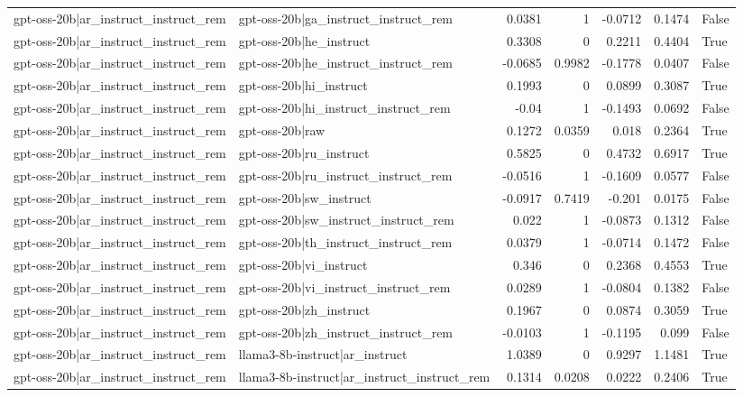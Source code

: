 \begin{table}
\begin{tabular}{l l r r r r l}
gpt-oss-20b|ar_instruct_instruct_rem & gpt-oss-20b|ga_instruct_instruct_rem & 0.0381 & 1 & -0.0712 & 0.1474 & False \\
gpt-oss-20b|ar_instruct_instruct_rem & gpt-oss-20b|he_instruct & 0.3308 & 0 & 0.2211 & 0.4404 & True \\
gpt-oss-20b|ar_instruct_instruct_rem & gpt-oss-20b|he_instruct_instruct_rem & -0.0685 & 0.9982 & -0.1778 & 0.0407 & False \\
gpt-oss-20b|ar_instruct_instruct_rem & gpt-oss-20b|hi_instruct & 0.1993 & 0 & 0.0899 & 0.3087 & True \\
gpt-oss-20b|ar_instruct_instruct_rem & gpt-oss-20b|hi_instruct_instruct_rem & -0.04 & 1 & -0.1493 & 0.0692 & False \\
gpt-oss-20b|ar_instruct_instruct_rem & gpt-oss-20b|raw & 0.1272 & 0.0359 & 0.018 & 0.2364 & True \\
gpt-oss-20b|ar_instruct_instruct_rem & gpt-oss-20b|ru_instruct & 0.5825 & 0 & 0.4732 & 0.6917 & True \\
gpt-oss-20b|ar_instruct_instruct_rem & gpt-oss-20b|ru_instruct_instruct_rem & -0.0516 & 1 & -0.1609 & 0.0577 & False \\
gpt-oss-20b|ar_instruct_instruct_rem & gpt-oss-20b|sw_instruct & -0.0917 & 0.7419 & -0.201 & 0.0175 & False \\
gpt-oss-20b|ar_instruct_instruct_rem & gpt-oss-20b|sw_instruct_instruct_rem & 0.022 & 1 & -0.0873 & 0.1312 & False \\
gpt-oss-20b|ar_instruct_instruct_rem & gpt-oss-20b|th_instruct_instruct_rem & 0.0379 & 1 & -0.0714 & 0.1472 & False \\
gpt-oss-20b|ar_instruct_instruct_rem & gpt-oss-20b|vi_instruct & 0.346 & 0 & 0.2368 & 0.4553 & True \\
gpt-oss-20b|ar_instruct_instruct_rem & gpt-oss-20b|vi_instruct_instruct_rem & 0.0289 & 1 & -0.0804 & 0.1382 & False \\
gpt-oss-20b|ar_instruct_instruct_rem & gpt-oss-20b|zh_instruct & 0.1967 & 0 & 0.0874 & 0.3059 & True \\
gpt-oss-20b|ar_instruct_instruct_rem & gpt-oss-20b|zh_instruct_instruct_rem & -0.0103 & 1 & -0.1195 & 0.099 & False \\
gpt-oss-20b|ar_instruct_instruct_rem & llama3-8b-instruct|ar_instruct & 1.0389 & 0 & 0.9297 & 1.1481 & True \\
gpt-oss-20b|ar_instruct_instruct_rem & llama3-8b-instruct|ar_instruct_instruct_rem & 0.1314 & 0.0208 & 0.0222 & 0.2406 & True \\

\end{tabular}
\end{table}
